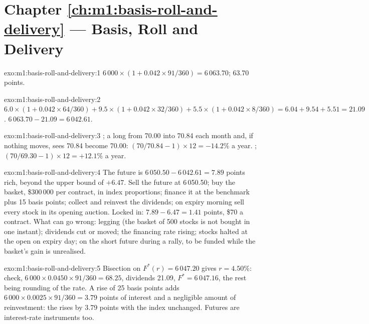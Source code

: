 \section*{Chapter \ref{ch:m1:basis-roll-and-delivery} --- Basis, Roll and Delivery}

\begin{solution}{exo:m1:basis-roll-and-delivery:1}
$6\,000 \times (1 + 0.042 \times 91/360) = 6\,063.70$;  63.70 points.
\end{solution}

\begin{solution}{exo:m1:basis-roll-and-delivery:2}
$6.0 \times (1 + 0.042 \times 64/360) + 9.5 \times (1 + 0.042 \times 32/360) + 5.5
\times (1 + 0.042 \times 8/360) = 6.04 + 9.54 + 5.51 = 21.09$. 
$6\,063.70 - 21.09 = 6\,042.61$.
\end{solution}

\begin{solution}{exo:m1:basis-roll-and-delivery:3}
; a long  from 70.00 into 70.84 each month and, if nothing
moves, sees 70.84 become 70.00: $(70/70.84 - 1) \times 12 = -14.2\%$ a year.
; $(70/69.30 - 1) \times 12 = +12.1\%$ a year.
\end{solution}

\begin{solution}{exo:m1:basis-roll-and-delivery:4}
The future is $6\,050.50 - 6\,042.61 = 7.89$ points rich, beyond the upper
bound of $+6.47$. Sell the future at 6\,050.50; buy the basket, \$300\,000 per
contract, in index proportions; finance it at the benchmark plus 15 basis
points; collect and reinvest the dividends; on expiry morning sell every
stock in its opening auction. Locked in: $7.89 - 6.47 = 1.41$ points, \$70 a
contract. What can go wrong: legging (the basket of 500 stocks is not bought
in one instant); dividends cut or moved; the financing rate rising; stocks
halted at the open on expiry day;  on the short future
during a rally, to be funded while the basket's gain is unrealised.
\end{solution}

\begin{solution}{exo:m1:basis-roll-and-delivery:5}
Bisection on $F^*(r) = 6\,047.20$ gives $r = 4.50\%$: check, $6\,000 \times
0.0450 \times 91/360 = 68.25$, dividends 21.09, $F^* = 6\,047.16$, the rest
being rounding of the rate. A rise of 25 basis points adds $6\,000 \times
0.0025 \times 91/360 = 3.79$ points of interest and a negligible amount of
reinvestment: the  rises by 3.79 points with the index unchanged.
Futures are interest-rate instruments too.
\end{solution}

